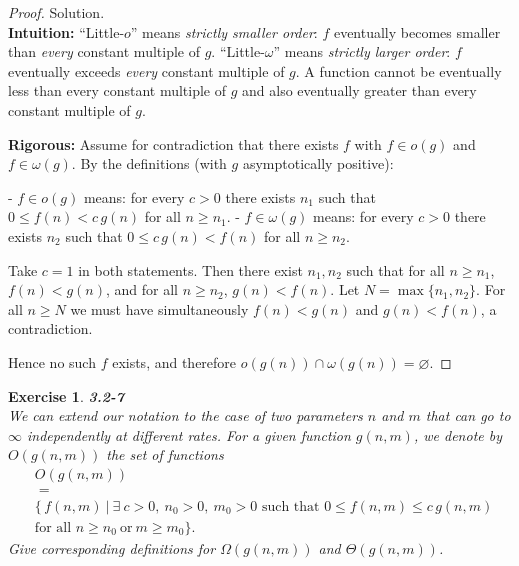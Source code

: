 \documentclass[12pt]{article}
\newtheorem{exercise}[theorem]{Exercise}
\theoremstyle{definition}
\begin{document}
\begin{proof}
Solution. \\

\noindent
\textbf{Intuition:}  
“Little-$o$” means \emph{strictly smaller order}: $f$ eventually becomes smaller than
\emph{every} constant multiple of $g$. “Little-$\omega$” means \emph{strictly larger order}:
$f$ eventually exceeds \emph{every} constant multiple of $g$. A function cannot be
eventually less than every constant multiple of $g$ and also eventually greater than
every constant multiple of $g$.

\noindent
\textbf{Rigorous:}  
Assume for contradiction that there exists $f$ with $f\in o(g)$ and $f\in \omega(g)$.
By the definitions (with $g$ asymptotically positive):

- $f\in o(g)$ means: for every $c>0$ there exists $n_1$ such that
  $0 \le f(n) < c\,g(n)$ for all $n\ge n_1$.
- $f\in \omega(g)$ means: for every $c>0$ there exists $n_2$ such that
  $0 \le c\,g(n) < f(n)$ for all $n\ge n_2$.

Take $c=1$ in both statements. Then there exist $n_1,n_2$ such that for all
$n\ge n_1$, $f(n) < g(n)$, and for all $n\ge n_2$, $g(n) < f(n)$.
Let $N=\max\{n_1,n_2\}$. For all $n\ge N$ we must have simultaneously
$f(n) < g(n)$ and $g(n) < f(n)$, a contradiction.

Hence no such $f$ exists, and therefore $o(g(n)) \cap \omega(g(n)) = \varnothing$.
\end{proof}

\newpage

\begin{exercise}
\noindent
\textbf{3.2-7} \\
We can extend our notation to the case of two parameters $n$ and $m$ that can go to $\infty$
independently at different rates. For a given function $g(n,m)$, we denote by $O(g(n,m))$
the set of functions
\[
\begin{aligned}
&O(g(n,m)) \\
&\;=\; \\
&\bigl\{\, f(n,m) \ \big|\ \exists\ c>0,\ n_0>0,\ m_0>0 \text{ such that }
0 \le f(n,m) \le c\,g(n,m)\ \\
& \text{for all } n \ge n_0 \ \text{or}\ m \ge m_0 \bigr\}.
\end{aligned}
\]
Give corresponding definitions for $\Omega(g(n,m))$ and $\Theta(g(n,m))$.
\end{exercise}
\end{document}
